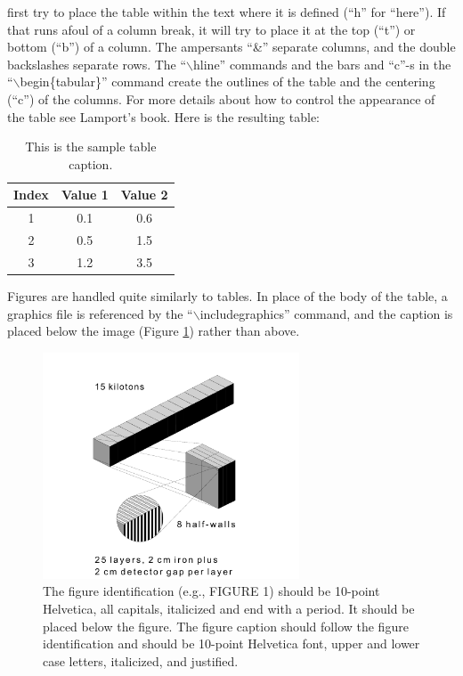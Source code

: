 \documentclass[letterpaper,10pt,twocolumn]{../aspe}
\begin{document}
first try to place the table within the text where it is defined (``h''
for ``here'').  If that runs afoul of a column break, it will try to place
it at the top (``t'') or bottom (``b'') of a column.
The ampersants ``\&'' separate columns, and the double backslashes separate
rows.  The ``$\backslash$hline'' commands and the bars and ``c''-s in the
``$\backslash$begin\{tabular\}'' command create the outlines of the table and the
centering (``c'') of the columns.  For more details about how to control the
appearance of the table see Lamport's book.\cite{Lamport1986}
Here is the resulting table:
\begin{table}[htb]
    \caption{\label{tableone}{This is the sample table caption.}}
    \vspace{10pt}
    \begin{tabular}[]{|c|c|c|}
        \hline
        Index & Value 1 & Value 2 \\ \hline
        1     & 0.1     & 0.6     \\
        2     & 0.5     & 1.5     \\
        3     & 1.2     & 3.5     \\ \hline
    \end{tabular}
\end{table}

Figures are handled quite similarly to tables.  In place of the body of the
table, a graphics file is referenced by the ``$\backslash$includegraphics'' command,
and the caption is placed below the image (Figure \ref{samplefigure})
rather than above.
\begin{figure}[htb]
    \begin{center}
        \includegraphics[width=3in,keepaspectratio=true]{node.pdf}
    \end{center}
    \caption{\label{samplefigure} The figure identification (e.g., FIGURE 1)
        should be 10-point Helvetica, all capitals, italicized and end with a
        period. It should be placed below the figure. The figure caption should
        follow the figure identification and should be 10-point Helvetica font,
        upper and lower case letters, italicized, and justified.}
\end{figure}
\end{document}
